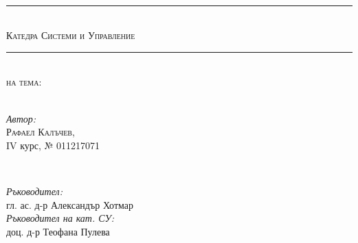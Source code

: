 \begin{titlepage}

	\center %


    	\textsc{\LARGE \textbf{\documenttype}}\\[0.5cm] %
\noindent\rule{16cm}{0.4pt}\\

	\textsc{\Large Катедра Системи и Управление}\\ %
\noindent\rule{16cm}{0.4pt}\\[1cm]
	\textsc{\large на тема:}\\[0.5cm] %




	{\huge\bfseries \documenttitle }\\[0.5cm] %




	\vspace{1cm}

	\begin{minipage}{0.4\textwidth}
		\begin{flushleft}
			\large
			\textit{Автор:}\\
		     \textsc{Рафаел Калъчев}, \\ IV курс, № 011217071\\
		\end{flushleft}
	\end{minipage}
	~
	\begin{minipage}{0.4\textwidth}
		\begin{flushleft}
			\large
			\textit{Ръководител:}\\
			гл. ас. д-р Александър Хотмар \\[1.5em]

                        \textit{Ръководител на кат. СУ:}\\
                        доц. д-р Теофана Пулева \\
		\end{flushleft}
	\end{minipage}


\end{titlepage}
